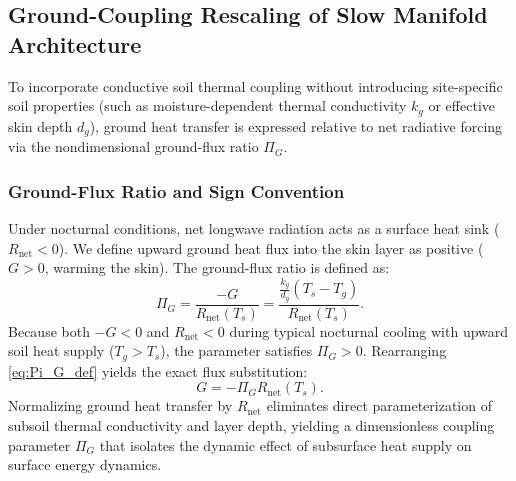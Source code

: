 \documentclass[11pt]{article}
\begin{document}
\subsection{Ground-Coupling Rescaling of Slow Manifold Architecture}
\label{subsec:ground_coupling_rescaling}

To incorporate conductive soil thermal coupling without introducing site-specific soil properties (such as moisture-dependent thermal conductivity $k_g$ or effective skin depth $d_g$), ground heat transfer is expressed relative to net radiative forcing via the nondimensional ground-flux ratio $\Pi_G$.

\subsubsection{Ground-Flux Ratio and Sign Convention}
Under nocturnal conditions, net longwave radiation acts as a surface heat sink ($R_{\text{net}} < 0$). We define upward ground heat flux into the skin layer as positive ($G > 0$, warming the skin). The ground-flux ratio is defined as:
\begin{equation}
\Pi_G = \frac{-G}{R_{\text{net}}(T_s)} = \frac{\frac{k_g}{d_g}(T_s - T_g)}{R_{\text{net}}(T_s)}.
\label{eq:Pi_G_def}
\end{equation}
Because both $-G < 0$ and $R_{\text{net}} < 0$ during typical nocturnal cooling with upward soil heat supply ($T_g > T_s$), the parameter satisfies $\Pi_G > 0$. Rearranging \eqref{eq:Pi_G_def} yields the exact flux substitution:
\begin{equation}
G = -\Pi_G R_{\text{net}}(T_s).
\label{eq:exact_G_substitution}
\end{equation}
Normalizing ground heat transfer by $R_{\text{net}}$ eliminates direct parameterization of subsoil thermal conductivity and layer depth, yielding a dimensionless coupling parameter $\Pi_G$ that isolates the dynamic effect of subsurface heat supply on surface energy dynamics.
\end{document}
